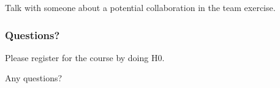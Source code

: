 \begin{assignment}
	\begin{task}
	Talk with someone about a potential collaboration in the team exercise.
	\end{task}
\end{assignment}

\begin{assignment}
	\frametitle{Questions?}
	\begin{task}
	Please register for the course by doing H0.
	\end{task}

	\begin{task}
	Any questions?
	\end{task}
\end{assignment}



\nocite{raab2017introducing}

\appendix

\begin{frame}[allowframebreaks]
	
	
\end{frame}




